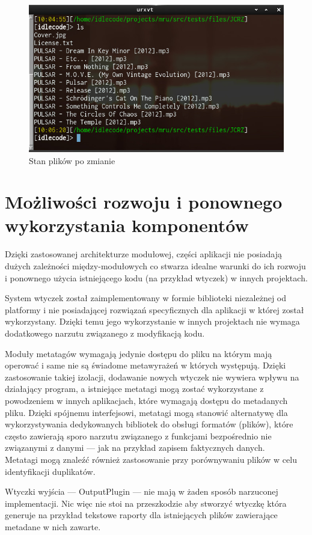\begin{figure}[h]
\begin{center}
\includegraphics[scale=0.70]{img/test_after.png}
\end{center}
\caption{Stan plików po zmianie}
\end{figure}

\section{Możliwości rozwoju i ponownego wykorzystania komponentów}
\par
Dzięki zastosowanej architekturze modułowej, części aplikacji nie posiadają dużych zależności między-modułowych co stwarza idealne warunki do ich rozwoju i ponownego użycia istniejącego kodu (na przykład wtyczek) w innych projektach.

\par
System wtyczek został zaimplementowany w formie biblioteki niezależnej od platformy i nie posiadającej rozwiązań specyficznych dla aplikacji w której został wykorzystany. Dzięki temu jego wykorzystanie w innych projektach nie wymaga dodatkowego narzutu związanego z modyfikacją kodu.

\par
Moduły metatagów wymagają jedynie dostępu do pliku na którym mają operować i same nie są świadome metawyrażeń w których występują. Dzięki zastosowanie takiej izolacji, dodawanie nowych wtyczek nie wywiera wpływu na działający program, a istniejące metatagi mogą zostać wykorzystane z powodzeniem w innych aplikacjach, które wymagają dostępu do metadanych pliku. Dzięki spójnemu interfejsowi, metatagi mogą stanowić alternatywę dla wykorzystywania dedykowanych bibliotek do obsługi formatów (plików), które często zawierają sporo narzutu związanego z funkcjami bezpośrednio nie związanymi z danymi --- jak na przykład zapisem faktycznych danych.\\
Metatagi mogą znaleźć również zastosowanie przy porównywaniu plików w celu identyfikacji duplikatów.

\par
Wtyczki wyjścia --- OutputPlugin --- nie mają w żaden sposób narzuconej implementacji.
Nic więc nie stoi na przeszkodzie aby stworzyć wtyczkę która generuje na przykład tekstowe raporty dla istniejących plików zawierające metadane w nich zawarte.